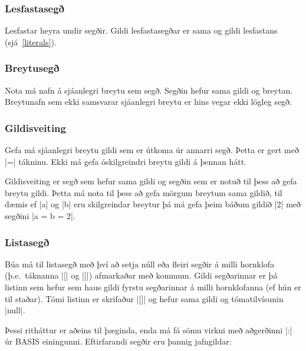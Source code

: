 \documentclass[12pt]{article}
\begin{document}
\subsubsection{Lesfastasegð}
Lesfastar heyra undir segðir. Gildi lesfastasegðar er sama og gildi lesfastans (sjá~\ref{literals}).

\subsubsection{Breytusegð}
Nota má nafn á sjáanlegri breytu sem segð. Segðin hefur sama gildi og breytan.
Breytunafn sem ekki samsvarar sjáanlegri breytu er hins vegar ekki lögleg segð.

\subsubsection{Gildisveiting}
Gefa má sjáanlegri breytu gildi sem er útkoma úr annarri segð.
Þetta er gert með |=| tákninu.
Ekki má gefa óskilgreindri breytu gildi á þennan hátt.

Gildisveiting er segð sem hefur sama gildi og segðin sem
er notuð til þess að gefa breytu gildi.
Þetta má nota til þess að gefa mörgum breytum sama gildið,
til dæmis ef |a| og |b| eru skilgreindar breytur þá
má gefa þeim báðum gildið |2| með segðini |a = b = 2|.

\subsubsection{Listasegð}
Búa má til listasegð með því að setja núll eða fleiri
segðir á milli hornklofa (þ.e.~táknanna |[| og |]|)
afmarkaðar með kommum. Gildi segðarinnar er þá
listinn sem hefur sem haus gildi fyrstu segðarinnar
á milli hornklofanna (ef hún er til staðar).
Tómi listinn er skrifaður |[]| og hefur sama gildi og
tómatilvísunin |null|.

Þessi ritháttur er aðeins til þæginda, enda má fá sömu virkni
með aðgerðinni |:| úr BASIS einingunni.
Eftirfarandi segðir eru þannig jafngildar:
\end{document}
